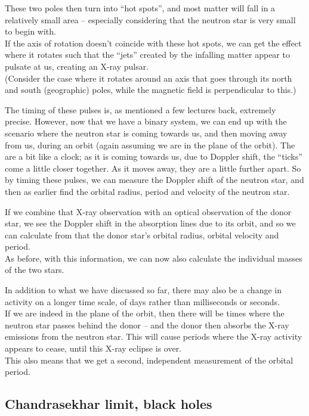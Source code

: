 These two poles then turn into ``hot spots'', and most matter will fall in a relatively small area -- especially considering that the neutron star is very small to begin with.\\
If the axis of rotation doesn't coincide with these hot spots, we can get the effect where it rotates such that the ``jets'' created by the infalling matter appear to pulsate at us, creating an X-ray pulsar.\\
(Consider the case where it rotates around an axis that goes through its north and south (geographic) poles, while the magnetic field is perpendicular to this.)

The timing of these pulses is, as mentioned a few lectures back, extremely precise. However, now that we have a binary system, we can end up with the scenario where the neutron star is coming towards us, and then moving away from us, during an orbit (again assuming we are in the plane of the orbit). The are a bit like a clock; as it is coming towards us, due to Doppler shift, the ``ticks'' come a little closer together. As it moves away, they are a little further apart. So by timing these pulses, we can measure the Doppler shift of the neutron star, and then as earlier find the orbital radius, period and velocity of the neutron star.

If we combine that X-ray observation with an optical observation of the donor star, we see the Doppler shift in the absorption lines due to its orbit, and so we can calculate from that the donor star's orbital radius, orbital velocity and period.\\
As before, with this information, we can now also calculate the individual masses of the two stars.

In addition to what we have discussed so far, there may also be a change in activity on a longer time scale, of days rather than milliseconds or seconds.\\
If we are indeed in the plane of the orbit, then there will be times where the neutron star passes behind the donor -- and the donor then absorbs the X-ray emissions from the neutron star. This will cause periods where the X-ray activity appears to cease, until this X-ray eclipse is over.\\
This also means that we get a second, independent measurement of the orbital period.

\subsection{Chandrasekhar limit, black holes}

